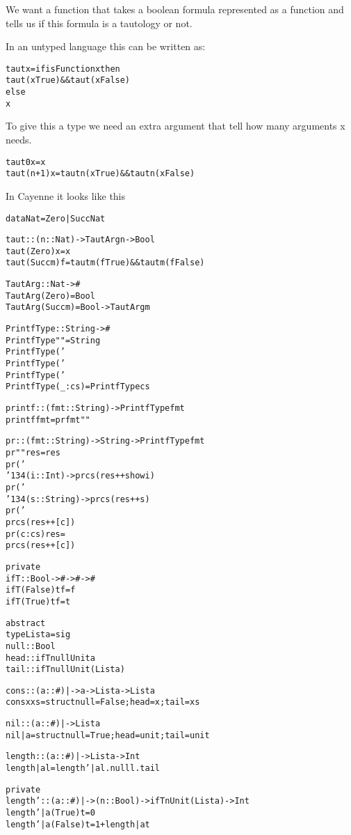 \documentclass[17pt]{foils} %
\newcommand\bs{\char '134}  %
\begin{document}
\newpage
{}

We want a function that takes a boolean formula
represented as a function and tells us if this
formula is a tautology or not.

In an untyped language this can be written as:
\begin{alltt}
taut x = if isFunction x then
            taut (x True) && taut (x False)
         else
            x
\end{alltt}

To give this a type we need an extra argument
that tell how many arguments x needs.

\begin{alltt}
taut 0 x = x
taut (n+1) x = taut n (x True) && taut n (x False)
\end{alltt}

In Cayenne it looks like this

\begin{alltt}
data Nat = Zero | Succ Nat

taut :: (n::Nat) -> TautArg n -> Bool
taut (Zero) x = x
taut (Succ m) f = taut m (f True) && taut m (f False)

TautArg :: Nat -> #
TautArg (Zero) = Bool
TautArg (Succ m) = Bool -> TautArg m
\end{alltt}

\newpage
{}
\begin{alltt}
PrintfType :: String -> #
PrintfType ""           = String
PrintfType ('%':'d':cs) = Int    -> PrintfType cs
PrintfType ('%':'s':cs) = String -> PrintfType cs
PrintfType ('%': _ :cs) =           PrintfType cs
PrintfType ( _ :cs)     =           PrintfType cs

printf :: (fmt::String) -> PrintfType fmt
printf fmt = pr fmt ""

pr :: (fmt::String) -> String -> PrintfType fmt
pr ""           res = res
pr ('%':'d':cs) res = 
      \bs (i::Int)    -> pr cs (res ++ show i)
pr ('%':'s':cs) res = 
      \bs (s::String) -> pr cs (res ++ s)
pr ('%': c :cs) res =
      pr cs (res ++ [c])
pr (c:cs)       res =
      pr cs (res ++ [c])
\end{alltt}

\newpage
{}
\begin{alltt}
private 
ifT :: Bool -> # -> # -> #
ifT (False) t f = f
ifT (True)  t f = t

abstract
type List a = sig
    null :: Bool 
    head :: ifT null Unit a
    tail :: ifT null Unit (List a)

cons :: (a :: #) |-> a -> List a -> List a
cons x xs = struct { null = False; head = x; tail = xs }

nil :: (a :: #) |-> List a
nil |a = struct { null = True; head = unit; tail = unit }

length :: (a :: #) |-> List a -> Int
length |a l = length' |a l.null l.tail

private
length' :: (a :: #) |-> (n::Bool) -> ifT n Unit (List a) -> Int
length' |a (True)  t = 0
length' |a (False) t = 1 + length |a t
\end{alltt}
\end{document}
